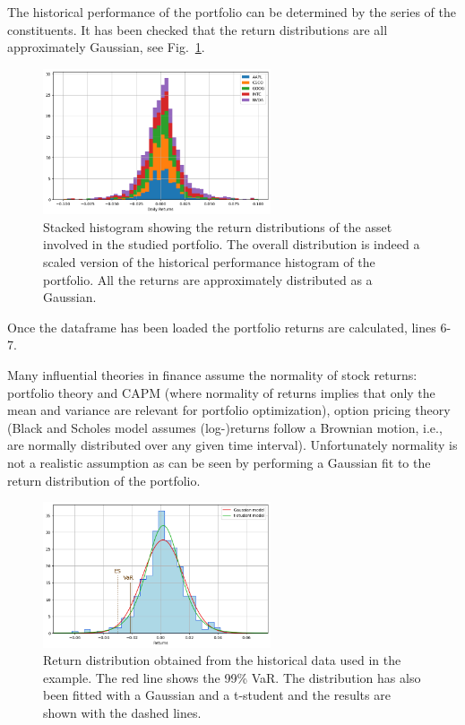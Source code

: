 The historical performance of the portfolio can be determined by the series of the constituents. It has been checked that the return distributions are all approximately Gaussian, see Fig.~\ref{fig:asset_return_distro}.

\begin{figure}[htb]
	\centering
	\includegraphics[width=0.6\textwidth]{figures/asset_return_distro}
	\caption{Stacked histogram showing the return distributions of the asset involved in the studied portfolio. The overall distribution is indeed a scaled version of the historical performance histogram of the portfolio. All the returns are approximately distributed as a Gaussian.}
	\label{fig:asset_return_distro}
\end{figure}


Once the dataframe has been loaded the portfolio returns are calculated, lines 6-7.

Many influential theories in finance assume the normality of stock returns: portfolio theory and CAPM (where normality of returns implies that only the mean and variance are relevant for portfolio optimization), option pricing theory (Black and Scholes model assumes (log-)returns follow a Brownian motion, i.e., are normally distributed over any given time interval).
Unfortunately normality is not a realistic assumption as can be seen by performing a Gaussian fit to the return distribution of the portfolio.

\begin{figure}[htb]
	\centering
	\includegraphics[width=0.6\textwidth]{figures/parametric_var}
	\caption{Return distribution obtained from the historical data used in the example. The red line shows the 99\% VaR. The distribution has also been fitted with a Gaussian and a t-student and the results are shown with the dashed lines.}
	\label{fig:paramtric_var}
\end{figure}

